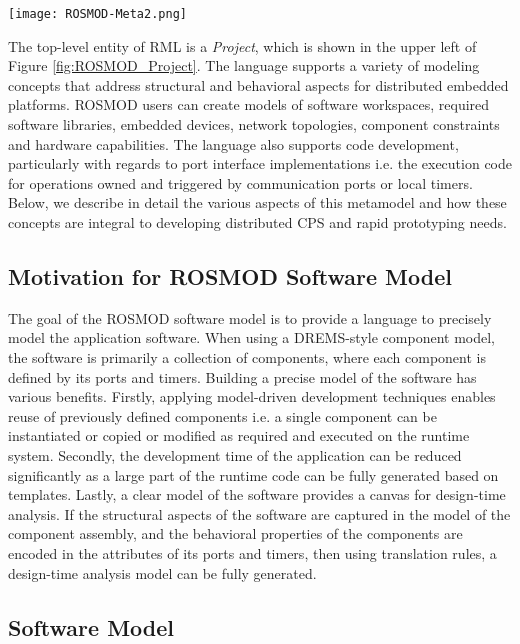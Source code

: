 \begin{figure*}[ht]
	\centering
	\texttt{[image: ROSMOD-Meta2.png]}
	\caption{ROSMOD Metamodel}
	\label{fig:ROSMOD_Project}	
\end{figure*}
\FloatBarrier

The top-level entity of RML is a \emph{Project}, which is shown in the upper left of Figure \ref{fig:ROSMOD_Project}.  The language supports a variety of modeling concepts that address structural and behavioral aspects for distributed embedded platforms. ROSMOD users can create models of software workspaces, required software libraries, embedded devices, network topologies, component constraints and hardware capabilities. The language also supports code development, particularly with regards to port interface implementations i.e. the execution code for operations owned and triggered by communication
ports or local timers. Below, we describe in detail the various aspects of this metamodel and how these concepts are integral to developing distributed CPS and rapid prototyping needs.

\subsection{Motivation for ROSMOD Software Model}

The goal of the ROSMOD software model is to provide a language to precisely model the application software. When using a DREMS-style component model, the software is primarily a collection of components, where each component is defined by its ports and timers. Building a precise model of the software has various benefits. Firstly, applying model-driven development techniques enables reuse of previously defined components i.e. a single component can be instantiated or copied or modified as required and executed on the runtime system. Secondly, the development time of the application can be reduced significantly as a large part of the runtime code can be fully generated based on templates. Lastly, a clear model of the software provides a canvas for design-time analysis. If the structural aspects of the software are captured in the model of the component assembly, and the behavioral properties of the components are encoded in the attributes of its ports and timers, then using translation rules, a design-time analysis model can be fully generated. 

\subsection{Software Model}

